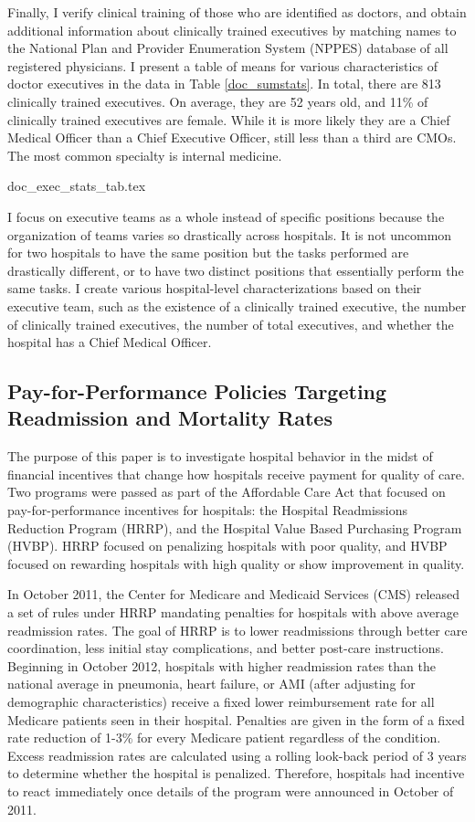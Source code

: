 \documentclass[12pt]{article}
\begin{document}
    Finally, I verify clinical training of those who are identified as doctors, and obtain additional information about clinically trained executives by matching names to the National Plan and Provider Enumeration System (NPPES) database of all registered physicians. I present a table of means for various characteristics of doctor executives in the data in Table \ref{doc_sumstats}. In total, there are 813 clinically trained executives. On average, they are 52 years old, and 11\% of clinically trained executives are female. While it is more likely they are a Chief Medical Officer than a Chief Executive Officer, still less than a third are CMOs. The most common specialty is internal medicine. 

    {doc_exec_stats_tab.tex}

    I focus on executive teams as a whole instead of specific positions because the organization of teams varies so drastically across hospitals. It is not uncommon for two hospitals to have the same position but the tasks performed are drastically different, or to have two distinct positions that essentially perform the same tasks. I create various hospital-level characterizations based on their executive team, such as the existence of a clinically trained executive, the number of clinically trained executives, the number of total executives, and whether the hospital has a Chief Medical Officer. 
  
    \subsection{Pay-for-Performance Policies Targeting Readmission and Mortality Rates}\label{sec:hrrp}

    The purpose of this paper is to investigate hospital behavior in the midst of financial incentives that change how hospitals receive payment for quality of care. Two programs were passed as part of the Affordable Care Act that focused on pay-for-performance incentives for hospitals: the Hospital Readmissions Reduction Program (HRRP), and the Hospital Value Based Purchasing Program (HVBP). HRRP focused on penalizing hospitals with poor quality, and HVBP focused on rewarding hospitals with high quality or show improvement in quality. 

    In October 2011, the Center for Medicare and Medicaid Services (CMS) released a set of rules under HRRP mandating penalties for hospitals with above average readmission rates. The goal of HRRP is to lower readmissions through better care coordination, less initial stay complications, and better post-care instructions. Beginning in October 2012, hospitals with higher readmission rates than the national average in pneumonia, heart failure, or AMI (after adjusting for demographic characteristics) receive a fixed lower reimbursement rate for all Medicare patients seen in their hospital. Penalties are given in the form of a fixed rate reduction of 1-3\% for every Medicare patient regardless of the condition. Excess readmission rates are calculated using a rolling look-back period of 3 years to determine whether the hospital is penalized. Therefore, hospitals had incentive to react immediately once details of the program were announced in October of 2011. 
\end{document}
